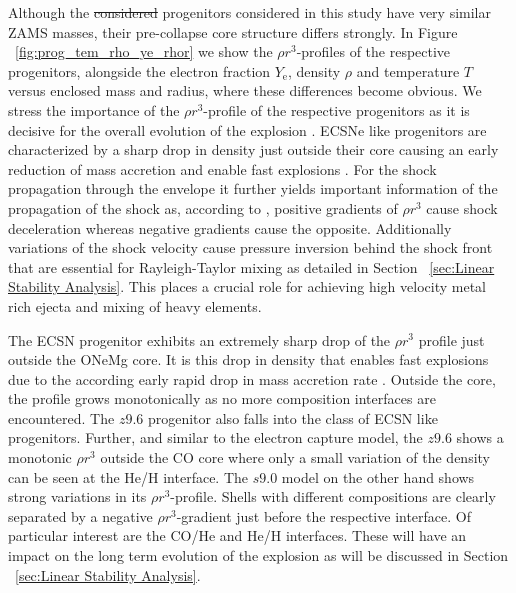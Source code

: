 \documentclass[fleqn,usenatbib]{mnras}
\newcommand{\NY}[2]{{\color{blue}\sout{#1}#2}}
\begin{document}
Although the \NY{considered}{} progenitors \NY{}{considered in this study} have very similar ZAMS masses, their \NY{}{pre-collapse core} structure differs strongly. In Figure ~\ref{fig:prog_tem_rho_ye_rhor} we show the $\rho r^3$-profiles of the respective progenitors, alongside the electron fraction $Y_{\mathrm{e}}$, density $\rho$ and temperature $T$ versus enclosed mass and radius, where these differences become obvious. We stress the importance of the $\rho r^3$-profile of the respective progenitors as it is decisive for the overall evolution of the explosion \citep{Kifonidis2003,Wongwathanarat2015}. ECSNe like progenitors are characterized by a sharp drop in density just outside their core causing an early reduction of mass accretion and enable fast explosions \cite{Mueller2019}.
For the shock propagation through the envelope it further yields important information of the propagation of the shock as, according to \cite{Sedov1961}, positive gradients of $\rho r^3$ cause shock deceleration whereas negative gradients cause the opposite. Additionally variations of the shock velocity cause pressure inversion behind the shock front that are essential for Rayleigh-Taylor mixing as detailed in Section ~\ref{sec:Linear Stability Analysis}. This places a crucial role for achieving high velocity metal rich ejecta \cite{Wongwathanarat2015} and mixing of heavy elements.

The ECSN progenitor exhibits an extremely sharp drop of the $\rho r^3$ profile just outside the ONeMg core. It is this drop in density that enables fast explosions due to the according early rapid drop in mass accretion rate \citep{Kitaura2006}. Outside the core, the profile grows monotonically as no more composition interfaces are encountered.
The $z9.6$ progenitor also falls into the class of ECSN like progenitors. Further, and similar to the electron capture model, the $z9.6$ shows a monotonic $\rho r^3$ outside the CO core where only a small variation of the density can be seen at the He/H interface.
The $s9.0$ model on the other hand shows strong variations in its $\rho r^3$-profile. Shells with different compositions are clearly separated by a negative $\rho r^3$-gradient just before the respective interface. Of particular interest are the CO/He and He/H interfaces. These will have an impact on the long term evolution of the explosion as will be discussed in Section ~\ref{sec:Linear Stability Analysis}.


\end{document}

